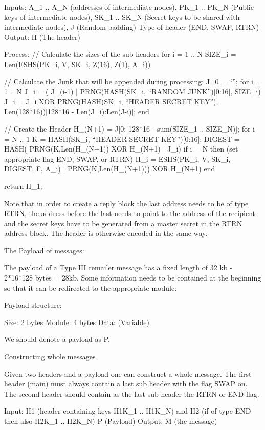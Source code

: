Inputs: A_1 .. A_N (addresses of intermediate nodes), 
	PK_1 .. PK_N (Public keys of intermediate nodes),
	SK_1 .. SK_N (Secret keys to be shared with intermediate nodes),
	J (Random padding)
	Type of header (END, SWAP, RTRN)
Output: H (The header)

Process: 
  // Calculate the sizes of the sub headers
  for i = 1 .. N
	SIZE_i = Len(ESHS(PK_i, V, SK_i, Z(16), Z(1), A_i))

  // Calculate the Junk that will be appended during processing:
  J_0 = ``'';
  for i = 1 .. N
	J_i = ( J_(i-1) | PRNG(HASH(SK_i, ``RANDOM JUNK'')[0:16], SIZE_i)
	J_i = J_i XOR PRNG(HASH(SK_i, ``HEADER SECRET KEY''),
  		Len(128*16))[128*16 - Len(J_i):Len(J-i)];
  end

  // Create the Header
  H_(N+1) = J[0: 128*16 - sum(SIZE_1 .. SIZE_N)];
  for i = N .. 1
	K = HASH(SK_i, ``HEADER SECRET KEY'')[0:16];
  	DIGEST = HASH( PRNG(K,Len(H_(N+1)) XOR H_(N+1) | J_i)
	if i = N then (set appropriate flag END, SWAP, or RTRN)
	H_i = ESHS(PK_i, V, SK_i, DIGEST, F, A_i) | PRNG(K,Len(H_(N+1))) XOR H_(N+1)
  end

return H_1;

Note that in order to create a reply block the last address needs to
be of type RTRN, the address before the last needs to point to the
address of the recipient and the secret keys have to be generated
from a master secret in the RTRN address block. The header is
otherwise encoded in the same way.

The Payload of messages:

The payload of a Type III remailer message has a fixed length of 32 kb
- 2*16*128 bytes = 28kb. Some information needs to be contained at the
beginning so that it can be redirected to the appropriate module:

Payload structure:

Size:   2 bytes
Module: 4 bytes
Data:   (Variable)

We should denote a payload as P.

Constructing whole messages

Given two headers and a payload one can construct a whole
message. The first header (main) must always contain a last sub header
with the flag SWAP on. The second header should contain as the last
sub header the RTRN or END flag.

Input: H1 (header containing keys H1K_1 .. H1K_N)
       and H2 (if of type END then also H2K_1 .. H2K_N)
       P (Payload)
Output: M (the message)

